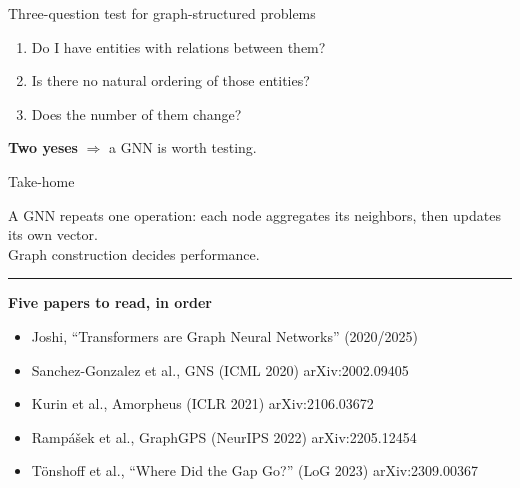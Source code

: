 \documentclass[aspectratio=169,11pt]{beamer}
\newcommand{\arx}[1]{{\scriptsize\color{dim}arXiv:#1}}
\begin{document}
\begin{frame}{Three-question test for graph-structured problems}
  \vspace{1.2em}
  \begin{enumerate}
    \setlength{\itemsep}{1.3em}
    \item \Large Do I have \alert{entities with relations} between them?
    \item \Large Is there \alert{no natural ordering} of those entities?
    \item \Large Does the \alert{number of them change}?
  \end{enumerate}
  \vspace{1.4em}
  \begin{center}\large
    \textbf{Two yeses} $\Rightarrow$ a GNN is worth testing.
  \end{center}
\end{frame}

\begin{frame}{Take-home}
  \vspace{0.2em}
  \begin{center}
    \large
    A GNN repeats one operation: \alert{each node aggregates its neighbors,
    then updates its own vector.}\\[0.6em]
    \alert{Graph construction} decides performance.
  \end{center}
  \vspace{0.6em}
  \hrule
  \vspace{0.4em}
  \scriptsize
  \textbf{Five papers to read, in order}
  \begin{itemize}\setlength{\itemsep}{0.05em}
    \item Joshi, ``Transformers are Graph Neural Networks'' (2020/2025)
    \item Sanchez-Gonzalez et al., GNS (ICML 2020) \arx{2002.09405}
    \item Kurin et al., Amorpheus (ICLR 2021) \arx{2106.03672}
    \item Ramp\'{a}\v{s}ek et al., GraphGPS (NeurIPS 2022) \arx{2205.12454}
    \item T\"{o}nshoff et al., ``Where Did the Gap Go?'' (LoG 2023) \arx{2309.00367}
  \end{itemize}
\end{frame}
\end{document}
